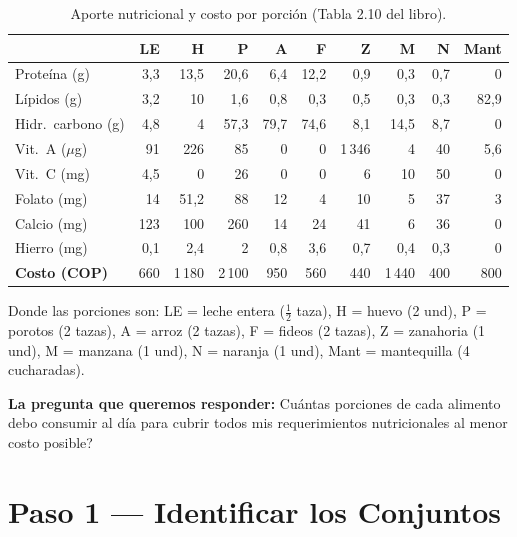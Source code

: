 \documentclass[12pt]{article}
\begin{document}
\begin{table}[h]
\centering
\small
\begin{tabular}{l *{9}{r}}
\toprule
& \textbf{LE} & \textbf{H} & \textbf{P} & \textbf{A}
& \textbf{F}  & \textbf{Z} & \textbf{M} & \textbf{N} & \textbf{Mant} \\
\midrule
Prote\'ina (g)          & 3,3  & 13,5  & 20,6 & 6,4  & 12,2 & 0,9   & 0,3  & 0,7  & 0    \\
L\'ipidos (g)           & 3,2  & 10    & 1,6  & 0,8  & 0,3  & 0,5   & 0,3  & 0,3  & 82,9 \\
Hidr.\ carbono (g)      & 4,8  & 4     & 57,3 & 79,7 & 74,6 & 8,1   & 14,5 & 8,7  & 0    \\
Vit.\ A ($\mu$g)        & 91   & 226   & 85   & 0    & 0    & 1\,346 & 4   & 40   & 5,6  \\
Vit.\ C (mg)            & 4,5  & 0     & 26   & 0    & 0    & 6     & 10   & 50   & 0    \\
Folato (mg)             & 14   & 51,2  & 88   & 12   & 4    & 10    & 5    & 37   & 3    \\
Calcio (mg)             & 123  & 100   & 260  & 14   & 24   & 41    & 6    & 36   & 0    \\
Hierro (mg)             & 0,1  & 2,4   & 2    & 0,8  & 3,6  & 0,7   & 0,4  & 0,3  & 0    \\
\midrule
\textbf{Costo (COP)}   & 660  & 1\,180 & 2\,100 & 950 & 560 & 440 & 1\,440 & 400 & 800 \\
\bottomrule
\end{tabular}
\caption{Aporte nutricional y costo por porci\'on (Tabla 2.10 del libro).}
\end{table}

Donde las porciones son: LE = leche entera ($\frac{1}{2}$ taza), H = huevo (2 und), P = porotos (2 tazas), A = arroz (2 tazas), F = fideos (2 tazas), Z = zanahoria (1 und), M = manzana (1 und), N = naranja (1 und), Mant = mantequilla (4 cucharadas).

\begin{cajanota}
\textbf{La pregunta que queremos responder:} \textquestiondown Cu\'antas porciones de cada alimento debo consumir al d\'ia para cubrir todos mis requerimientos nutricionales al menor costo posible?
\end{cajanota}

\section{Paso 1 --- Identificar los Conjuntos}
\end{document}
